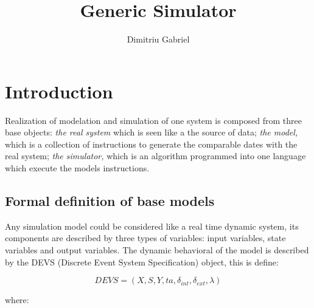 \documentclass[a4paper,oneside,notitlepage]{article}
\begin{document}
\title{Generic Simulator}
\author{Dimitriu Gabriel}
\maketitle
\tableofcontents

\section{\protect\bigskip Introduction}

Realization of modelation and simulation of one system is composed from
three base objects: \textit{the real system }which is seen like a the source
of data; \textit{the model,} which is a collection of instructions to
generate the comparable dates with the real system; \textit{the simulator,}
which is an algorithm programmed into one language which execute the models
instructions.

\subsection{Formal definition of base models}

Any simulation model could be considered like a real time dynamic system,
its components are described by three types of variables: input variables,
state variables and output variables. The dynamic behavioral of the model is
described by the DEVS (Discrete Event System Specification) object, this is
define:

\begin{equation}
DEVS=(X,S,Y,ta,\delta _{int},\delta _{ext},\lambda )  \label{DEVS}
\end{equation}

where:
\end{document}
